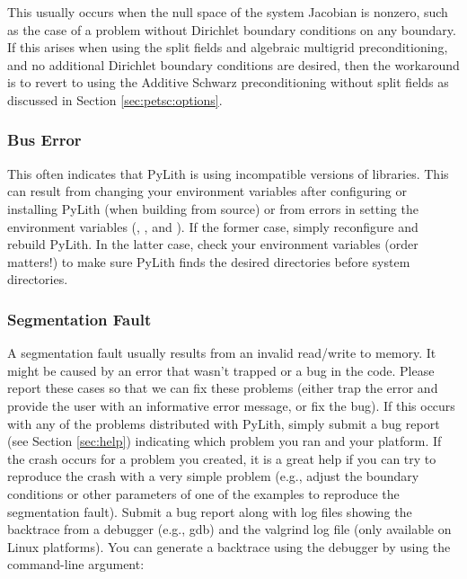 This usually occurs when the null space of the system Jacobian is
nonzero, such as the case of a problem without Dirichlet boundary
conditions on any boundary. If this arises when using the split fields
and algebraic multigrid preconditioning, and no additional Dirichlet
boundary conditions are desired, then the workaround is to revert
to using the Additive Schwarz preconditioning without split fields
as discussed in Section \vref{sec:petsc:options}.

\subsubsection{Bus Error}

This often indicates that PyLith is using incompatible versions of
libraries. This can result from changing your environment variables
after configuring or installing PyLith (when building from source) or
from errors in setting the environment variables (,
, and ). If the
former case, simply reconfigure and rebuild PyLith. In the latter
case, check your environment variables (order matters!) to make sure
PyLith finds the desired directories before system directories.

\subsubsection{Segmentation Fault}

A segmentation fault usually results from an invalid read/write to
memory. It might be caused by an error that wasn't trapped or a bug in
the code. Please report these cases so that we can fix these problems
(either trap the error and provide the user with an informative error
message, or fix the bug). If this occurs with any of the problems
distributed with PyLith, simply submit a bug report (see Section
\vref{sec:help}) indicating which problem you ran and your
platform. If the crash occurs for a problem you created, it is a great
help if you can try to reproduce the crash with a very simple problem
(e.g., adjust the boundary conditions or other parameters of one of
the examples to reproduce the segmentation fault). Submit a bug report
along with log files showing the backtrace from a debugger (e.g., gdb)
and the valgrind log file (only available on Linux platforms).  You
can generate a backtrace using the debugger by using the
 command-line argument:

